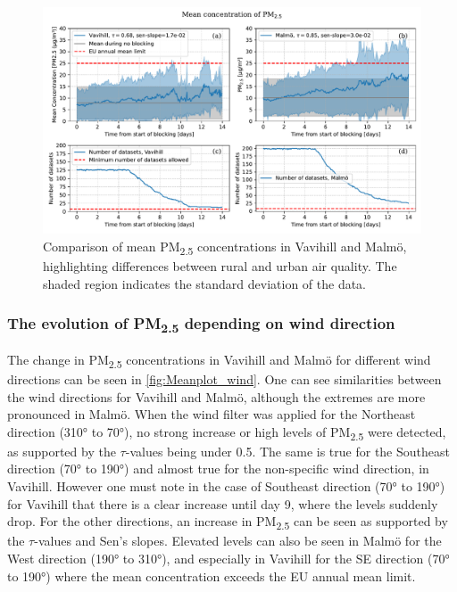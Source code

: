 \begin{figure}[H]
    \centering
    \includegraphics[width=\textwidth]{Figures/Meanplot.pdf}
    \caption{Comparison of mean PM\textsubscript{2.5} concentrations in Vavihill and Malmö, highlighting differences between rural and urban air quality. The shaded region indicates the standard deviation of the data.}
    \label{fig:Meanplot_Comparison}
\end{figure}

\subsubsection{The evolution of \texorpdfstring{PM\textsubscript{2.5}}{PM2.5} depending on wind direction}
The change in PM\textsubscript{2.5} concentrations in Vavihill and Malmö for different wind directions can be seen in \autoref{fig:Meanplot_wind}. One can see similarities between the wind directions for Vavihill and Malmö, although the extremes are more pronounced in Malmö. When the wind filter was applied for the Northeast direction (310° to 70°), no strong increase or high levels of PM\textsubscript{2.5} were detected, as supported by the $\tau$-values being under 0.5. The same is true for the Southeast direction (70° to 190°) and almost true for the non-specific wind direction, in Vavihill. However one must note in the case of Southeast direction (70° to 190°) for Vavihill that there is a clear increase until day 9, where the levels suddenly drop. For the other directions, an increase in PM\textsubscript{2.5} can be seen as supported by the $\tau$-values and Sen's slopes. Elevated levels can also be seen in Malmö for the West direction (190° to 310°), and especially in Vavihill for the SE direction (70° to 190°) where the mean concentration exceeds the EU annual mean limit.


